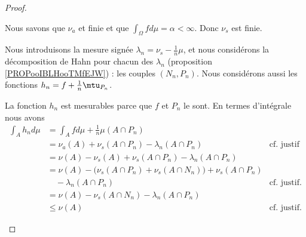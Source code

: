 \begin{proof}
\begin{subproof}

		Nous savons que \( \nu_a\) et finie et que \( \int_{\Omega}fd\mu=\alpha<\infty\). Donc \( \nu_s\) est finie.

		\spitem[\( \nu_s\perp\mu\)]

		Nous introduisons la mesure signée \( \lambda_n=\nu_s-\frac{1}{  n}\mu\), et nous considérons la décomposition de Hahn pour chacun des \( \lambda_n\) (proposition \ref{PROPooIBLHooTMfEJW}) : les couples \( (N_n, P_n)\). Nous considérons aussi les fonctions \( h_n=f+\frac{1}{ n}\mtu_{P_n}\).

		\begin{subproof}
			\spitem[\( h_n\in \mH\)]
			La fonction \( h_n\) est mesurables parce que \( f\) et \( P_n\) le sont. En termes d'intégrale nous avons
			\begin{subequations}
				\begin{align}
					\int_Ah_nd\mu & =\int_Afd\mu +\frac{1}{ n}\mu(A\cap P_n)                                                                                                                                  \\
					              & =\nu_a(A)+\nu_s(A\cap P_n)-\lambda_n(A\cap P_n)                                                                         & \text{cf. justif}		\label{SUBEQooAVCMooXXSXZO}  \\
					              & = \nu(A)-\nu_s(A)+\nu_s(A\cap P_n)-\lambda_n(A\cap P_n)                                                                                                                   \\
					              & =\nu(A)-\big( \nu_s(A\cap P_n)+\nu_s(A\cap N_n) \big)+\nu_s(A\cap P_n)                       \label{SUEQooUJUDooLFrBcR}                                                   \\
					              & \nonumber\quad-\lambda_n(A\cap P_n)                                                                                     & \text{cf. justif.}                              \\
					              & =\nu(A) -\nu_s(A\cap N_n)-\lambda_n(A\cap P_n)                                                                                                                            \\
					              & \leq \nu(A)                                                                                                             & \text{cf. justif.}		\label{SUBEQooACEXooWCHuag}

\end{align}
\end{subequations}
\end{subproof}
\end{subproof}
\end{proof}
